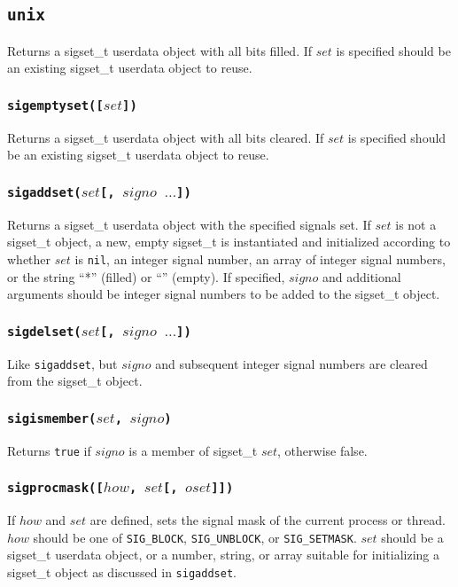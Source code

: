 \documentclass[11pt, oneside]{memoir}
\newcommand*{\true}[0]{\texttt{true}\xspace}
\newcommand*{\nil}[0]{\texttt{nil}\xspace}
\newcommand*{\fn}[1]{\texttt{#1}\xspace}
\newcounter{toccols}
\newenvironment{Module}[1]{
	\subsection{\texttt{#1}}
	\addtocontents{toc}{
		\protect\begin{multicols}{\value{toccols}}
	}
}{
	\addtocontents{toc}{\protect\end{multicols}}
}
\begin{document}
\begin{Module}{unix}
Returns a sigset\_t userdata object with all bits filled. If $set$ is specified should be an existing
sigset\_t userdata object to reuse.

\subsubsection[\fn{sigemptyset}]{\fn{sigemptyset([$set$])}}

Returns a sigset\_t userdata object with all bits cleared. If $set$ is specified should be an existing
sigset\_t userdata object to reuse.

\subsubsection[\fn{sigaddset}]{\fn{sigaddset($set$[, $signo$ $\ldots$])}}

Returns a sigset\_t userdata object with the specified signals set. If $set$ is not a sigset\_t object, a new, empty sigset\_t is instantiated and initialized according to whether $set$ is \nil, an integer signal number, an array of integer signal numbers, or the string ``*'' (filled) or ``'' (empty). If specified, $signo$ and additional arguments should be integer signal numbers to be added to the sigset\_t object.

\subsubsection[\fn{sigdelset}]{\fn{sigdelset($set$[, $signo$ $\ldots$])}}

Like \fn{sigaddset}, but $signo$ and subsequent integer signal numbers are cleared from the sigset\_t object.

\subsubsection[\fn{sigismember}]{\fn{sigismember($set$, $signo$)}}

Returns \true if $signo$ is a member of sigset\_t $set$, otherwise false.

\subsubsection[\fn{sigprocmask}]{\fn{sigprocmask([$how$, $set$[, $oset$]])}}

If $how$ and $set$ are defined, sets the signal mask of the current process or thread. $how$ should be one of \texttt{SIG\_BLOCK}, \texttt{SIG\_UNBLOCK}, or \texttt{SIG\_SETMASK}. $set$ should be a sigset\_t userdata object, or a number, string, or array suitable for initializing a sigset\_t object as discussed in \fn{sigaddset}.


\end{Module}
\end{document}
